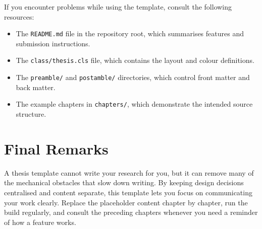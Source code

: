 If you encounter problems while using the template, consult the following resources:

\begin{itemize}
\item The \texttt{README.md} file in the repository root, which summarises features and submission instructions.
\item The \texttt{class/thesis.cls} file, which contains the layout and colour definitions.
\item The \texttt{preamble/} and \texttt{postamble/} directories, which control front matter and back matter.
\item The example chapters in \texttt{chapters/}, which demonstrate the intended source structure.
\end{itemize}

\section{Final Remarks}

A thesis template cannot write your research for you, but it can remove many of the mechanical obstacles that slow down writing. By keeping design decisions centralised and content separate, this template lets you focus on communicating your work clearly. Replace the placeholder content chapter by chapter, run the build regularly, and consult the preceding chapters whenever you need a reminder of how a feature works.
